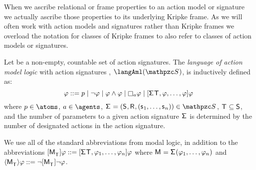 When we ascribe relational or frame properties to an action model or signature we actually ascribe those properties to its underlying Kripke frame.
As we will often work with action models and signatures rather than Kripke frames we overload the notation for classes of Kripke frames to also refer to classes of action models or signatures.

\begin{definition}
Let \aSignatureFamily{} be a non-empty, countable set of action signatures.
The {\em language of action model logic} with action signatures \aSignatureFamily{}, $\langAml(\aSignatureFamily)$, is inductively defined as:
$$
\phi ::=
    \atomP \mid
    \lnot \phi \mid
    \phi \land \phi \mid
    \necessaryA \phi \mid
    \actionA{\aSignature \aStatesT, \phi, \dots, \phi} \phi\\
$$
where $\atomP \in \atoms$, $\agentA \in \agents$, $\aSignatureAndTuple \in \aSignatureFamily$, $\aStatesT \subseteq \aStates$, and the number of parameters to a given action signature $\aSignature$ is determined by the number of designated actions in the action signature.
\end{definition}

We use all of the standard abbreviations from modal logic, in addition to the abbreviations 
$\actionA{\aPModel{\aStatesT}} \phi ::= \actionA{\aSignature \aStatesT, \phi_1, \dots, \phi_n} \phi$ where $\aModel = \aSignature(\phi_1, \dots, \phi_n)$ and 
$\actionE{\aPModel{\aStatesT}} \phi ::= \lnot \actionA{\aPModel{\aStatesT}} \lnot \phi$.

